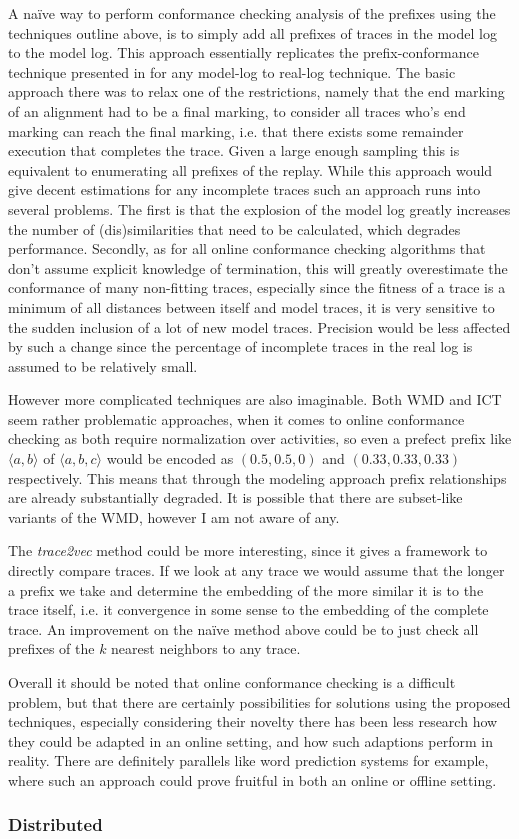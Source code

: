 \documentclass[runningheads]{template/llncs}
\begin{document}
A naïve way to perform conformance checking analysis of the prefixes using the techniques outline above, is to simply add all prefixes of traces in the model log  to the model log.
This approach essentially replicates the prefix-conformance technique presented in \cite{ZBK*19} for any model-log to real-log technique.
The basic approach there was to relax one of the restrictions, namely that the end marking of an alignment had to be a final marking, to consider all traces who's end marking can reach the final marking, i.e. that there exists some remainder execution that completes the trace.
Given a large enough sampling this is equivalent to enumerating all prefixes of the replay.
While this approach would give decent estimations for any incomplete traces such an approach runs into several problems.
The first is that the explosion of the model log greatly increases the number of (dis)similarities that need to be calculated, which degrades performance.
Secondly, as for all online conformance checking algorithms that don't assume explicit knowledge of termination, this will greatly overestimate the conformance of many non-fitting traces, especially since the fitness of a trace is a minimum of all distances between itself and model traces, it is very sensitive to the sudden inclusion of a lot of new model traces.
Precision would be less affected by such a change since the percentage of incomplete traces in the real log is assumed to be relatively small.

However more complicated techniques are also imaginable.
Both WMD and ICT seem rather problematic approaches, when it comes to online conformance checking as both require normalization over activities, so even a prefect prefix like $\langle a,b\rangle$ of $\langle a,b,c\rangle$ would be encoded as $(0.5,0.5,0)$ and $(0.33,0.33,0.33)$ respectively.
This means that through the modeling approach prefix relationships are already substantially degraded.
It is possible that there are subset-like variants of the WMD, however I am not aware of any.

The \emph{trace2vec} method could be more interesting, since it gives a framework to directly compare traces.
If we look at any trace we would assume that the longer a prefix we take and determine the embedding of the more similar it is to the trace itself, i.e. it convergence in some sense to the embedding of the complete trace.
An improvement on the naïve method above could be to just check all prefixes of the $k$ nearest neighbors to any trace.

Overall it should be noted that online conformance checking is a difficult problem, but that there are certainly possibilities for solutions using the proposed techniques, especially considering their novelty there has been less research how they could be adapted in an online setting, and how such adaptions perform in reality.
There are definitely parallels like word prediction systems for example, where such an approach could prove fruitful in both an online or offline setting.

\subsubsection{Distributed}
\color{black}
%
%
%


%
\end{document}
